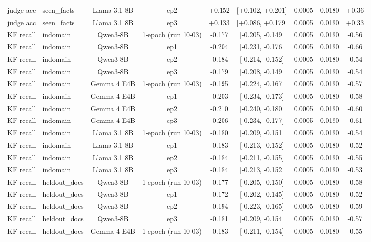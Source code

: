 \begin{table}[t]
{\begin{tabular}{llccccccc}
judge acc & seen\_facts & Llama 3.1 8B & ep2 & +0.152 & [+0.102, +0.201] & 0.0005 & 0.0180 & +0.36 \\
judge acc & seen\_facts & Llama 3.1 8B & ep3 & +0.133 & [+0.086, +0.179] & 0.0005 & 0.0180 & +0.33 \\
KF recall & indomain & Qwen3-8B & 1-epoch (run 10-03) & -0.177 & [-0.205, -0.149] & 0.0005 & 0.0180 & -0.56 \\
KF recall & indomain & Qwen3-8B & ep1 & -0.204 & [-0.231, -0.176] & 0.0005 & 0.0180 & -0.66 \\
KF recall & indomain & Qwen3-8B & ep2 & -0.184 & [-0.214, -0.152] & 0.0005 & 0.0180 & -0.54 \\
KF recall & indomain & Qwen3-8B & ep3 & -0.179 & [-0.208, -0.149] & 0.0005 & 0.0180 & -0.54 \\
KF recall & indomain & Gemma 4 E4B & 1-epoch (run 10-03) & -0.195 & [-0.224, -0.167] & 0.0005 & 0.0180 & -0.57 \\
KF recall & indomain & Gemma 4 E4B & ep1 & -0.203 & [-0.234, -0.173] & 0.0005 & 0.0180 & -0.58 \\
KF recall & indomain & Gemma 4 E4B & ep2 & -0.210 & [-0.240, -0.180] & 0.0005 & 0.0180 & -0.60 \\
KF recall & indomain & Gemma 4 E4B & ep3 & -0.206 & [-0.234, -0.177] & 0.0005 & 0.0180 & -0.61 \\
KF recall & indomain & Llama 3.1 8B & 1-epoch (run 10-03) & -0.180 & [-0.209, -0.151] & 0.0005 & 0.0180 & -0.54 \\
KF recall & indomain & Llama 3.1 8B & ep1 & -0.183 & [-0.213, -0.152] & 0.0005 & 0.0180 & -0.52 \\
KF recall & indomain & Llama 3.1 8B & ep2 & -0.184 & [-0.211, -0.155] & 0.0005 & 0.0180 & -0.55 \\
KF recall & indomain & Llama 3.1 8B & ep3 & -0.184 & [-0.213, -0.152] & 0.0005 & 0.0180 & -0.53 \\
KF recall & heldout\_docs & Qwen3-8B & 1-epoch (run 10-03) & -0.177 & [-0.205, -0.150] & 0.0005 & 0.0180 & -0.58 \\
KF recall & heldout\_docs & Qwen3-8B & ep1 & -0.172 & [-0.202, -0.145] & 0.0005 & 0.0180 & -0.52 \\
KF recall & heldout\_docs & Qwen3-8B & ep2 & -0.194 & [-0.223, -0.165] & 0.0005 & 0.0180 & -0.59 \\
KF recall & heldout\_docs & Qwen3-8B & ep3 & -0.181 & [-0.209, -0.154] & 0.0005 & 0.0180 & -0.57 \\
KF recall & heldout\_docs & Gemma 4 E4B & 1-epoch (run 10-03) & -0.183 & [-0.211, -0.154] & 0.0005 & 0.0180 & -0.55 \\

\end{tabular}}
\end{table}
